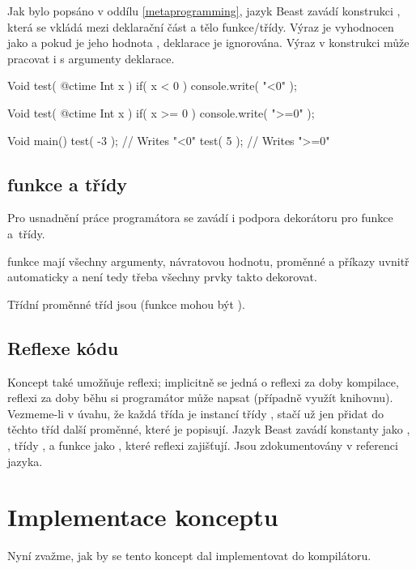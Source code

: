 Jak bylo popsáno v oddílu \ref{metaprogramming}, jazyk Beast zavádí konstrukci , která se vkládá mezi deklarační část a tělo funkce/třídy. Výraz  je vyhodnocen jako  a pokud je jeho hodnota , deklarace je ignorována. Výraz v konstrukci může pracovat i s \ctime argumenty deklarace.

\begin{code}
Void test( @ctime Int x )
	if( x < 0 )
{
	console.write( "<0" );
}

Void test( @ctime Int x )
	if( x >= 0 )
{
	console.write( ">=0" );
}

Void main() {
	test( -3 ); // Writes "<0"
	test( 5 ); // Writes ">=0"
}
\end{code}

\subsection{\ctime funkce a třídy}
Pro usnadnění práce programátora se zavádí i podpora dekorátoru  pro funkce a~třídy.

\ctime funkce mají všechny argumenty, návratovou hodnotu, proměnné a příkazy uvnitř automaticky \ctime a není tedy třeba všechny prvky takto dekorovat.

Třídní proměnné \ctime tříd jsou \ctime (funkce mohou být \nonctime).

\subsection{Reflexe kódu} \label{ctime:reflection}
Koncept také umožňuje reflexi; implicitně se jedná o reflexi za doby kompilace, reflexi za doby běhu si programátor může napsat (případně využít knihovnu). Vezmeme-li v úvahu, že každá třída je instancí \ctime třídy , stačí už jen přidat do těchto tříd další \ctime proměnné, které je popisují. Jazyk Beast zavádí \ctime konstanty jako , , třídy ,  a funkce jako , které reflexi zajišťují. Jsou zdokumentovány v referenci jazyka.

\section{Implementace konceptu}
Nyní zvažme, jak by se tento koncept dal implementovat do kompilátoru.

